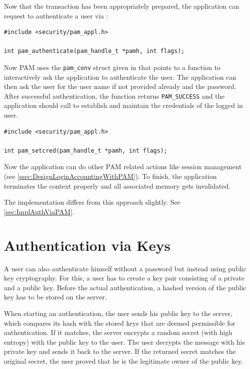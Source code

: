 \documentclass[10pt,a4paper,titlepage,twoside,english,final]{zhawreprt}
\begin{document}
Now that the transaction has been appropriately prepared, the application can request to authenticate a user via \cite{pam_authenticate}:
\setlistingC
\begin{lstlisting}[caption={\gls{PAM} authentication},label=lst:PAMAuthentication]
#include <security/pam_appl.h>

int pam_authenticate(pam_handle_t *pamh, int flags);
\end{lstlisting}

Now \gls{PAM} uses the \texttt{pam\_conv} struct given in \cite{pam_start} that points to a function to interactively ask the application to authenticate the user. The application can then ask the user for the user name if not provided already and the password. After successful authentication, the function returns \texttt{PAM\_SUCCESS} and the application should call \cite{pam_setcred} to establish and maintain the credentials of the logged in user.
\setlistingC
\begin{lstlisting}[caption={\gls{PAM} credential setting},label=lst:PAMCredSet]
#include <security/pam_appl.h>

int pam_setcred(pam_handle_t *pamh, int flags);
\end{lstlisting}

Now the application can do other \gls{PAM} related actions like session management (see \ref{ssec:DesignLoginAccountingWithPAM}). To finish, the application terminates the context properly and all associated memory gets invalidated.

The implementation differs from this approach slightly. See \ref{sec:ImplAuthViaPAM}.

\section{Authentication via Keys}\label{sec:DesignAuthViaKeys}
A user can also authenticate himself without a password but instead using public key cryptography. For this, a user has to create a key pair consisting of a private and a public key. Before the actual authentication, a hashed version of the public key has to be stored on the server.

When starting an authentication, the user sends his public key to the server, which compares its hash with the stored keys that are deemed permissible for authentication. If it matches, the server encrypts a random secret (with high entropy) with the public key to the user. The user decrypts the message with his private key and sends it back to the server. If the returned secret matches the original secret, the user proved that he is the legitimate owner of the public key.
\end{document}
